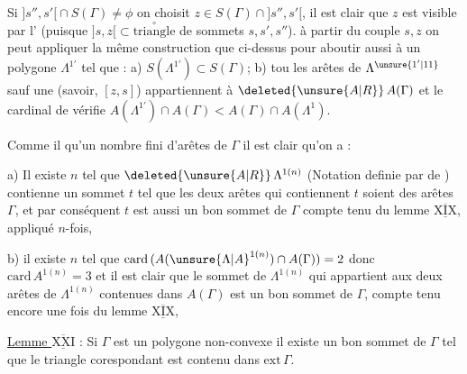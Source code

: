 Si $ {]s'',s'[}\cap S(\Gamma)\ne\phi$ on choisit $z\in S(\Gamma)\cap{]s'',s'[}$, il est clair que $z$ est visible  par l' (puisque $ {]s,z[}\subset\overset{\circ}{\text{triangle}}$ de sommets $s,s',s''$). à partir du couple $s,z$ on peut appliquer la même construction que ci-dessus pour aboutir aussi à un polygone $\Lambda^{1'}$ tel que : a) $S(\Lambda^{1'})\subset S(\Gamma)$; b)
tou les  arêtes de $\Lambda^{\unsure{1'|11}}$ sauf une (savoir, $[z,s]$) appartiennent à $\deleted{\unsure{A|R}}\,A(\Gamma)$ et le cardinal de vérifie $A(\Lambda^{1'})\cap A(\Gamma)<A(\Gamma)\cap A(\Lambda^1)$.

Comme il  qu'un nombre fini d'arêtes de $\Gamma$ il est clair qu'on  a :

a) Il existe $n$ tel que $\deleted{\unsure{A|R}}\,\Lambda^{1(n)}$ (Notation definie par  de  ) contienne un  sommet $t$ tel que les deux arêtes qui contiennent $t$ soient des arêtes $\Gamma$, et par conséquent $t$ est aussi un bon sommet de $\Gamma$ compte tenu du lemme $\overline{\underline{\mathrm{XIX}}}$, appliqué $n$-fois, 

b) il existe $n$ tel que $\mathrm{card}\,(A({\unsure{\Lambda|A}}^{1(n)})\cap A(\Gamma))=2$ donc $\mathrm{card}\,A^{1(n)}=3$ et il est clair que le  sommet de $\Lambda^{1(n)}$ qui appartient aux deux arêtes de $\Lambda^{1(n)}$ contenues dans $A(\Gamma)$ est un bon sommet de $\Gamma$, compte tenu encore une fois du lemme $\overline{\underline{\mathrm{XIX}}}$, 

\uline{Lemme $\overline{\underline{\mathrm{XXI}}}$} : Si $\Gamma$ est un polygone non-convexe il existe un bon sommet de $\Gamma$ tel que le  triangle corespondant est contenu dans $\mathrm{ext}\,\Gamma$.


